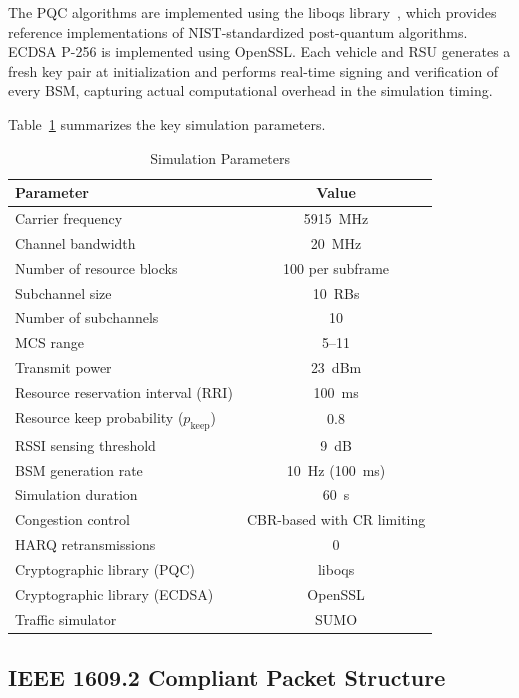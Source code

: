 \documentclass[letterpaper,journal]{IEEEtran}
\begin{document}
The PQC algorithms are implemented using the liboqs library~\cite{stebila2020liboqs}, which provides reference implementations of NIST-standardized post-quantum algorithms. ECDSA P-256 is implemented using OpenSSL. Each vehicle and RSU generates a fresh key pair at initialization and performs real-time signing and verification of every BSM, capturing actual computational overhead in the simulation timing.

Table~\ref{tab:sim_params} summarizes the key simulation parameters.

\begin{table}[!htbp]
    \caption{Simulation Parameters}
    \label{tab:sim_params}
    \centering
    \begin{tabular}{lc}
    \toprule
    \textbf{Parameter} & \textbf{Value} \\
    \midrule
    Carrier frequency          & 5915~MHz \\
    Channel bandwidth          & 20~MHz \\
    Number of resource blocks  & 100 per subframe \\
    Subchannel size            & 10~RBs \\
    Number of subchannels      & 10 \\
    MCS range                  & 5--11 \\
    Transmit power             & 23~dBm \\
    Resource reservation interval (RRI) & 100~ms \\
    Resource keep probability ($p_\text{keep}$) & 0.8 \\
    RSSI sensing threshold     & 9~dB \\
    BSM generation rate        & 10~Hz (100~ms) \\
    Simulation duration        & 60~s \\
    Congestion control         & CBR-based with CR limiting \\
    HARQ retransmissions       & 0 \\
    Cryptographic library (PQC)  & liboqs \\
    Cryptographic library (ECDSA) & OpenSSL \\
    Traffic simulator          & SUMO \\
    \bottomrule
    \end{tabular}
\end{table}

\subsection{IEEE 1609.2 Compliant Packet Structure}
\label{sec:packet_structure}
\end{document}
